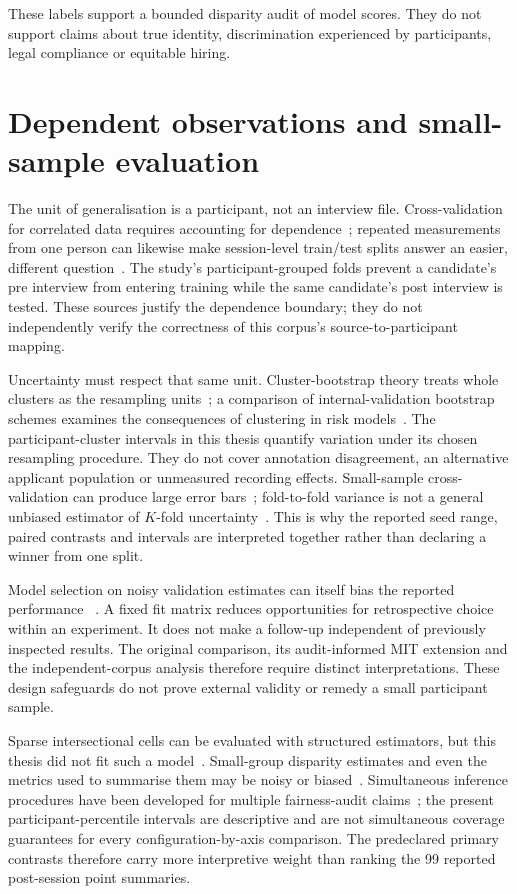 These labels support a bounded disparity audit of model scores. They do not support claims about
true identity, discrimination experienced by participants, legal compliance or equitable hiring.

\section{Dependent observations and small-sample evaluation}

The unit of generalisation is a participant, not an interview file. Cross-validation for
correlated data requires accounting for dependence~\cite{RabinowiczRosset2022}; repeated
measurements from one person can likewise make session-level train/test splits answer an easier,
different question~\cite{Saeb2017}. The study's participant-grouped folds prevent a
candidate's pre interview from entering training while the same candidate's post interview is
tested. These sources justify the dependence boundary; they do not independently verify the
correctness of this corpus's source-to-participant mapping.

Uncertainty must respect that same unit. Cluster-bootstrap theory treats whole clusters as the
resampling units~\cite{FieldWelsh2007}; a comparison of internal-validation bootstrap schemes
examines the consequences of clustering in risk models~\cite{Bouwmeester2013}. The
participant-cluster intervals in this
thesis quantify variation under its chosen resampling procedure. They do not cover annotation
disagreement, an alternative applicant population or unmeasured recording effects. Small-sample
cross-validation can produce large error bars~\cite{Varoquaux2018}; fold-to-fold variance is not
a general unbiased estimator of $K$-fold uncertainty~\cite{BengioGrandvalet2004}. This is why the
reported seed range, paired contrasts and intervals are interpreted together rather than
declaring a winner from one split.

Model selection on noisy validation estimates can itself bias the reported performance
~\cite{CawleyTalbot2010}. A fixed fit matrix reduces opportunities for retrospective
choice within an experiment. It does not make a follow-up independent of previously
inspected results. The original comparison, its audit-informed MIT extension and the
independent-corpus analysis therefore require distinct interpretations. These design
safeguards do not prove external validity or remedy a small participant sample.

Sparse intersectional cells can be evaluated with structured estimators, but this thesis did
not fit such a model~\cite{Herlihy2024}. Small-group disparity estimates and even the metrics
used to summarise them may be noisy or biased~\cite{Lum2022}. Simultaneous inference procedures
have been developed for multiple fairness-audit claims~\cite{CherianCandes2024}; the present
participant-percentile intervals are descriptive and are not simultaneous coverage guarantees
for every configuration-by-axis comparison. The predeclared primary contrasts therefore carry
more interpretive weight than ranking the 99 reported post-session point summaries.

